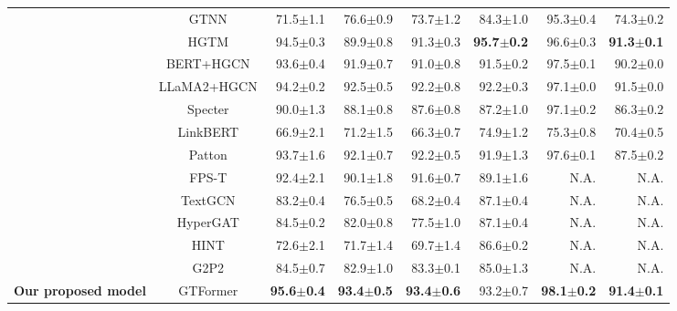 \begin{table*}[t]
{\begin{tabular}{c|c|rrrrrr}
            {} & GTNN & 71.5$ \pm $1.1 & 76.6$ \pm $0.9 & 73.7$ \pm $1.2 & 84.3$ \pm $1.0 & 95.3$ \pm $0.4 & 74.3$ \pm $0.2 \\
            {} & HGTM & 94.5$ \pm $0.3 & 89.9$ \pm $0.8 & 91.3$ \pm $0.3 & \textbf{95.7}$ \pm $\textbf{0.2} & 96.6$ \pm $0.3 & \textbf{91.3}$ \pm $\textbf{0.1} \\
            \hline
             & BERT+HGCN & 93.6$ \pm $0.4 & 91.9$ \pm $0.7 & 91.0$ \pm $0.8 & 91.5$ \pm $0.2 & 97.5$ \pm $0.1 & 90.2$ \pm $0.0 \\
            {} & LLaMA2+HGCN & 94.2$ \pm $0.2 & 92.5$ \pm $0.5 & 92.2$ \pm $0.8 & 92.2$ \pm $0.3 & 97.1$ \pm $0.0 & 91.5$ \pm $0.0 \\
            {} & Specter & 90.0$ \pm $1.3 & 88.1$ \pm $0.8 & 87.6$ \pm $0.8 & 87.2$ \pm $1.0 & 97.1$ \pm $0.2 & 86.3$ \pm $0.2 \\
            {} & LinkBERT & 66.9$ \pm $2.1 & 71.2$ \pm $1.5 & 66.3$ \pm $0.7 & 74.9$ \pm $1.2 & 75.3$ \pm $0.8 & 70.4$ \pm $0.5 \\
            {} & Patton & 93.7$ \pm $1.6 & 92.1$ \pm $0.7 & 92.2$ \pm $0.5 & 91.9$ \pm $1.3 & 97.6$ \pm $0.1 & 87.5$ \pm $0.2 \\
            \hline
             & FPS-T & 92.4$ \pm $2.1 & 90.1$ \pm $1.8 & 91.6$ \pm $0.7 & 89.1$ \pm $1.6 & N.A. & N.A. \\
            \hline
             & TextGCN & 83.2$ \pm $0.4 & 76.5$ \pm $0.5 & 68.2$ \pm $0.4 & 87.1$ \pm $0.4 & N.A. & N.A. \\
            {} & HyperGAT & 84.5$ \pm $0.2 & 82.0$ \pm $0.8 & 77.5$ \pm $1.0 & 87.1$ \pm $0.4 & N.A. & N.A. \\
			{} & HINT & 72.6$ \pm $2.1 & 71.7$ \pm $1.4 & 69.7$ \pm $1.4 & 86.6$ \pm $0.2 & N.A. & N.A. \\
            {} & G2P2 & 84.5$ \pm $0.7 & 82.9$ \pm $1.0 & 83.3$ \pm $0.1 & 85.0$ \pm $1.3 & N.A. & N.A. \\
            \hline
            {\textbf{Our proposed model}} & GTFormer & \textbf{95.6}$ \pm $\textbf{0.4} & \textbf{93.4}$ \pm $\textbf{0.5} & \textbf{93.4}$ \pm $\textbf{0.6} & 93.2$ \pm $0.7 & \textbf{98.1}$ \pm $\textbf{0.2} & \textbf{91.4}$ \pm $\textbf{0.1} \\
			\bottomrule
		\end{tabular}
	}
	\vspace{-0.2cm}
	\label{table:link_prediction}
\end{table*}

